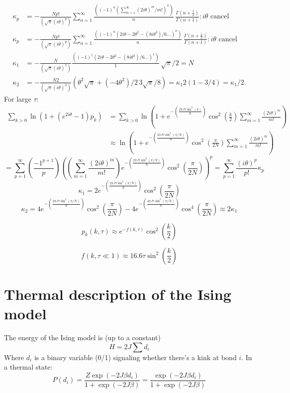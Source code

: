 \documentclass{article}
\begin{document}
\begin{align*}
    \kappa_p & = -\frac{N p!}{(\sqrt{\pi} (i\theta)^p)} \sum_{n=1}^{\infty} \frac{((-1)^n (\sum_{m=1}^{\infty}(2i\theta)^m/m!)^n)}{n} \, \frac{\Gamma\left(n+\frac{1}{2}\right)}{\Gamma(n+1)} : i\theta \text{ cancel}      \\
    \kappa_p & = -\frac{N p!}{(\sqrt{\pi} (i\theta)^p)} \sum_{n=1}^{\infty} \frac{((-1)^n (2i\theta-2\theta^2-(8i\theta^3)/6\ldots)^n)}{n} \, \frac{\Gamma\left(n+\frac{1}{2}\right)}{\Gamma(n+1)} : i\theta \text{ cancel} \\
    \kappa_1 & = -\frac{N}{(\sqrt{\pi} (i\theta)^1)} \frac{((-1)^1 (2i\theta-2\theta^2-(8i\theta^3)/6\ldots)^1)}{1} \, \sqrt{\pi}/2=N                                                                                       \\
    \kappa_2 & = -\frac{N 2}{(\sqrt{\pi} (i\theta)^2)} (\theta^2 \sqrt{\pi}+(-4\theta^2)/2 \, 3 \sqrt{\pi}/8)=\kappa_1 2(1-3/4)=\kappa_1/2.
\end{align*}
For large $\tau$:
\begin{align*}
    \sum_{k>0} \ln(1+(e^{2i\theta}-1) p_k) & = \sum_{k>0} \ln\left(1+e^{-\left(\frac{2\pi J\tau \sin^2 (k)}{\hbar}\right)} \cos^2 \left(\frac{k}{2}\right) \sum_{m=1}^{\infty} \frac{(2i\theta)^m}{m!}\right)   \\
                                           & \approx \ln\left(1+e^{-\left(\frac{2\pi J\tau \sin^2 (\pi/N)}{\hbar}\right)} \cos^2 \left(\frac{\pi}{2N}\right) \sum_{m=1}^{\infty} \frac{(2i\theta)^m}{m!}\right)
\end{align*}
\[
    = \sum_{p=1}^{\infty} \left(\frac{-1^{p+1}}{p}\right) \left(\left(\sum_{m=1}^{\infty} \frac{(2i\theta)^m}{m!}\right) e^{-\left(\frac{2\pi J\tau \sin^2 (\pi/N)}{\hbar}\right)} \cos^2 \left(\frac{\pi}{2N}\right)\right)^p = \sum_{p=1}^{\infty} \frac{(i\theta)^p}{p!} \kappa_p
\]
\[
    \kappa_1 = 2e^{-\left(\frac{2\pi J\tau \sin^2 (\pi/N)}{\hbar}\right)} \cos^2 \left(\frac{\pi}{2N}\right)
\]
\[
    \kappa_2 = 4e^{-\left(\frac{2\pi J\tau \sin^2 (\pi/N)}{\hbar}\right)} \cos^2 \left(\frac{\pi}{2N}\right) - 4e^{-\left(\frac{4\pi J\tau \sin^2 (\pi/N)}{\hbar}\right)} \cos^4 \left(\frac{\pi}{2N}\right) \approx 2\kappa_1
\]

\[
    p_k(k, \tau) \approx e^{-f(k,\tau)} \cos^2 \left(\frac{k}{2}\right)
\]

\[
    f(k, \tau \ll 1) \approx 16.6\tau \sin^2 \left(\frac{k}{2}\right)
\]

\section*{Thermal description of the Ising model}
The energy of the Ising model is (up to a constant)
\[
    H = 2J \sum d_i
\]
Where $d_i$ is a binary variable (0/1) signaling whether there's a kink at bond $i$. In a thermal state:
\[
    P(d_i) = \frac{Z \exp(-2J\beta d_i)}{1 + \exp(-2J \beta)} = \frac{\exp(-2J \beta d_i)}{1 + \exp(-2J \beta)}
\]
\end{document}
